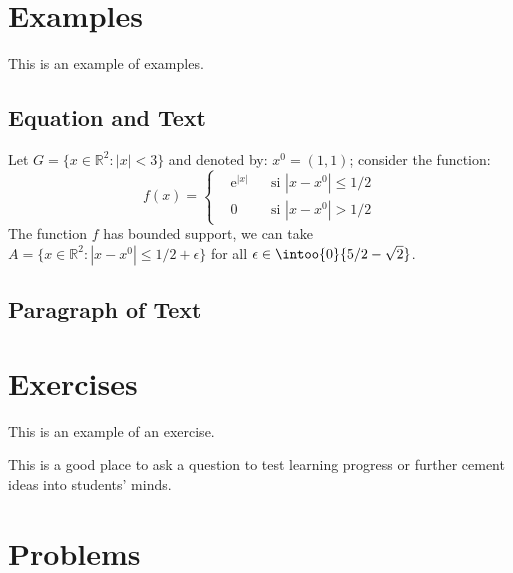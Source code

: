 \section{Examples}

This is an example of examples.

\subsection{Equation and Text}

\begin{example}
Let $G=\{x\in\mathbb{R}^2:|x|<3\}$ and denoted by: $x^0=(1,1)$; consider the function:
\begin{equation}
f(x)=\left\{\begin{aligned} & \mathrm{e}^{|x|} & & \text{si $|x-x^0|\leq 1/2$}\\
& 0 & & \text{si $|x-x^0|> 1/2$}\end{aligned}\right.
\end{equation}
The function $f$ has bounded support, we can take $A=\{x\in\mathbb{R}^2:|x-x^0|\leq 1/2+\epsilon\}$ for all $\epsilon\in\intoo{0}{5/2-\sqrt{2}}$.
\end{example}

\subsection{Paragraph of Text}

\begin{example}
\lipsum[2]
\end{example}


\section{Exercises}

This is an example of an exercise.

\begin{exercise}
This is a good place to ask a question to test learning progress or further cement ideas into students' minds.
\end{exercise}


\section{Problems}

